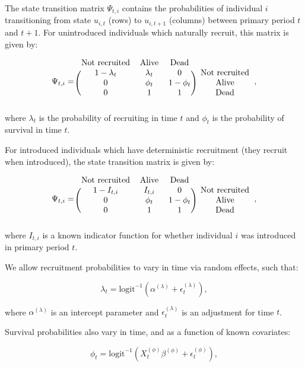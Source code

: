 \documentclass[9pt,twoside,lineno]{pnas-new}
\begin{document}
The state transition matrix \(\Psi_{t, i}\) contains the probabilities
of individual \(i\) transitioning from state \(u_{i, t}\) (rows) to
\(u_{i, t+1}\) (columns) between primary period \(t\) and \(t+1\). For
unintroduced individuals which naturally recruit, this matrix is given
by:

\[
\Psi_{t, i} =
\begin{blockarray}{cccc}
  \text{Not recruited} & \text{Alive} & \text{Dead} \\
\begin{block}{(ccc)c}
  1 - \lambda_t & \lambda_t & 0 & \text{Not recruited} \\
  0 & \phi_t & 1 - \phi_t & \text{Alive} \\
  0 & 1 & 1 & \text{Dead} \\
\end{block}
\end{blockarray},
\] where \(\lambda_t\) is the probability of recruiting in time \(t\)
and \(\phi_t\) is the probability of survival in time \(t\).

For introduced individuals which have deterministic recruitment (they
recruit when introduced), the state transition matrix is given by:

\[
\Psi_{t, i} =
\begin{blockarray}{cccc}
  \text{Not recruited} & \text{Alive} & \text{Dead} \\
\begin{block}{(ccc)c}
  1 - I_{t, i} & I_{t, i} & 0 & \text{Not recruited} \\
  0 & \phi_t & 1 - \phi_t & \text{Alive} \\
  0 & 1 & 1 & \text{Dead} \\
\end{block}
\end{blockarray},
\] where \(I_{t, i}\) is a known indicator function for whether
individual \(i\) was introduced in primary period \(t\).

We allow recruitment probabilities to vary in time via random effects,
such that:

\[\lambda_t = \text{logit}^{-1}(\alpha^{(\lambda)} + \epsilon^{(\lambda)}_t),\]

where \(\alpha^{(\lambda)}\) is an intercept parameter and
\(\epsilon^{(\lambda)}_t\) is an adjustment for time \(t\).

Survival probabilities also vary in time, and as a function of known
covariates:

\[\phi_t = \text{logit}^{-1}(X^{(\phi)}_t \beta^{(\phi)} + \epsilon^{(\phi)}_t),\]
\end{document}

